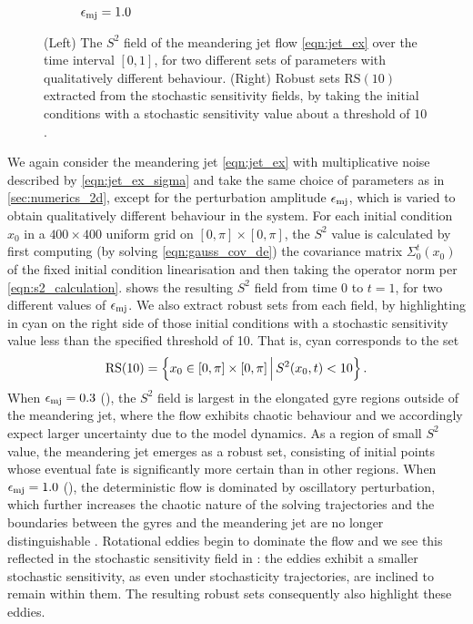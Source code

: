 \begin{figure}
\begin{center}
\begin{subfigure}{\textwidth}
			\caption{\(\epsilon_{\mathrm{mj}} = 1.0\)}
			\label{fig:s2_field_1.0}
		\end{subfigure}
		\caption{(Left) The \(S^2\) field of the meandering jet flow \cref{eqn:jet_ex} over the time interval \([0,1]\), for two different sets of parameters with qualitatively different behaviour.
			(Right) Robust sets \(\mathrm{RS}\!\left(10\right)\) extracted from the stochastic sensitivity fields, by taking the initial conditions with a stochastic sensitivity value about a threshold of \(10\).}
		\label{fig:ex_jet_s2_field}
	\end{center}
\end{figure}

We again consider the meandering jet \cref{eqn:jet_ex} with multiplicative noise described by \cref{eqn:jet_ex_sigma} and take the same choice of parameters as in \cref{sec:numerics_2d}, except for the perturbation amplitude \(\epsilon_{\mathrm{mj}}\), which is varied to obtain qualitatively different behaviour in the system.
For each initial condition \(x_0\) in a \(400 \times 400\) uniform grid on \(\left[0, \pi\right] \times \left[0, \pi\right]\), the \(S^2\) value is calculated by first computing (by solving \cref{eqn:gauss_cov_de}) the covariance matrix \(\Sigma_0^t\!\left(x_0\right)\) of the fixed initial condition linearisation and then taking the operator norm per \cref{eqn:s2_calculation}.
 shows the resulting \(S^2\) field from time \(0\) to \(t = 1\), for two different values of \(\epsilon_{\mathrm{mj}}\).
We also extract robust sets from each field, by highlighting in cyan on the right side of  those initial conditions with a stochastic sensitivity value less than the specified threshold of 10.
That is, cyan corresponds to the set
\[
	\mathrm{RS}\!\left(10\right) = \left\{x_0 \in [0,\pi] \times [0,\pi]\,\middle|\,S^2\!\left(x_0, t\right) < 10\right\}.
\]
When \(\epsilon_{\mathrm{mj}} = 0.3\) (), the \(S^2\) field is largest in the elongated gyre regions outside of the meandering jet, where the flow exhibits chaotic behaviour \citep{Pierrehumbert_1991_ChaoticMixingTracer} and we accordingly expect larger uncertainty due to the model dynamics.
As a region of small \(S^2\) value, the meandering jet emerges as a robust set, consisting of initial points whose eventual fate is significantly more certain than in other regions.
When \(\epsilon_{\mathrm{mj}} = 1.0\) (), the deterministic flow is dominated by oscillatory perturbation, which further increases the chaotic nature of the solving trajectories and the boundaries between the gyres and the meandering jet are no longer distinguishable \citep{Crocker_2021_LagrangianCoherentData}.
Rotational eddies begin to dominate the flow and we see this reflected in the stochastic sensitivity field in : the eddies exhibit a smaller stochastic sensitivity, as even under stochasticity trajectories, are inclined to remain within them.
The resulting robust sets consequently also highlight these eddies.

